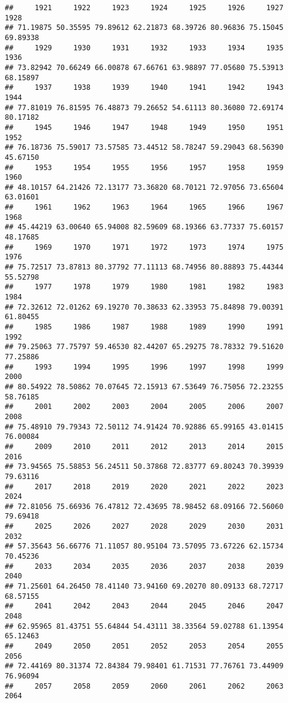 \documentclass[
]{article}
\begin{document}
\begin{verbatim}
##     1921     1922     1923     1924     1925     1926     1927     1928 
## 71.19875 50.35595 79.89612 62.21873 68.39726 80.96836 75.15045 69.89338 
##     1929     1930     1931     1932     1933     1934     1935     1936 
## 73.82942 70.66249 66.00878 67.66761 63.98897 77.05680 75.53913 68.15897 
##     1937     1938     1939     1940     1941     1942     1943     1944 
## 77.81019 76.81595 76.48873 79.26652 54.61113 80.36080 72.69174 80.17182 
##     1945     1946     1947     1948     1949     1950     1951     1952 
## 76.18736 75.59017 73.57585 73.44512 58.78247 59.29043 68.56390 45.67150 
##     1953     1954     1955     1956     1957     1958     1959     1960 
## 48.10157 64.21426 72.13177 73.36820 68.70121 72.97056 73.65604 63.01601 
##     1961     1962     1963     1964     1965     1966     1967     1968 
## 45.44219 63.00640 65.94008 82.59609 68.19366 63.77337 75.60157 48.17685 
##     1969     1970     1971     1972     1973     1974     1975     1976 
## 75.72517 73.87813 80.37792 77.11113 68.74956 80.88893 75.44344 55.52798 
##     1977     1978     1979     1980     1981     1982     1983     1984 
## 72.32612 72.01262 69.19270 70.38633 62.33953 75.84898 79.00391 61.80455 
##     1985     1986     1987     1988     1989     1990     1991     1992 
## 79.25063 77.75797 59.46530 82.44207 65.29275 78.78332 79.51620 77.25886 
##     1993     1994     1995     1996     1997     1998     1999     2000 
## 80.54922 78.50862 70.07645 72.15913 67.53649 76.75056 72.23255 58.76185 
##     2001     2002     2003     2004     2005     2006     2007     2008 
## 75.48910 79.79343 72.50112 74.91424 70.92886 65.99165 43.01415 76.00084 
##     2009     2010     2011     2012     2013     2014     2015     2016 
## 73.94565 75.58853 56.24511 50.37868 72.83777 69.80243 70.39939 79.63116 
##     2017     2018     2019     2020     2021     2022     2023     2024 
## 72.81056 75.66936 76.47812 72.43695 78.98452 68.09166 72.56060 79.69418 
##     2025     2026     2027     2028     2029     2030     2031     2032 
## 57.35643 56.66776 71.11057 80.95104 73.57095 73.67226 62.15734 70.45236 
##     2033     2034     2035     2036     2037     2038     2039     2040 
## 71.25601 64.26450 78.41140 73.94160 69.20270 80.09133 68.72717 68.57155 
##     2041     2042     2043     2044     2045     2046     2047     2048 
## 62.95965 81.43751 55.64844 54.43111 38.33564 59.02788 61.13954 65.12463 
##     2049     2050     2051     2052     2053     2054     2055     2056 
## 72.44169 80.31374 72.84384 79.98401 61.71531 77.76761 73.44909 76.96094 
##     2057     2058     2059     2060     2061     2062     2063     2064 

\end{verbatim}
\end{document}
